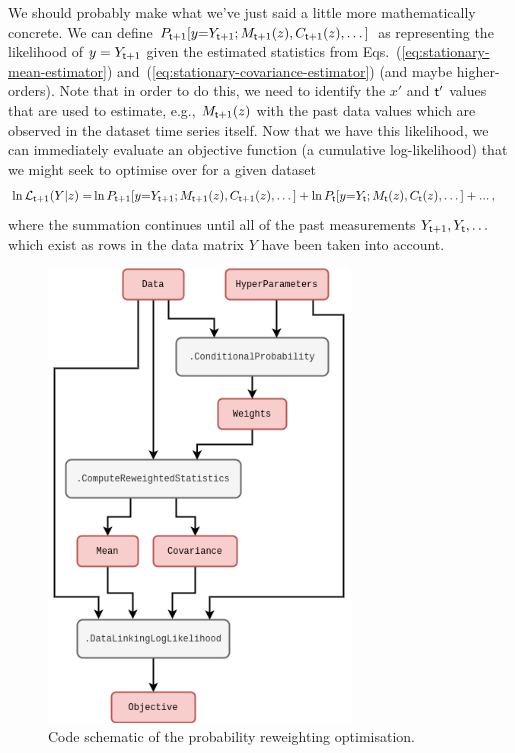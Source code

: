 We should probably make what we've just said a little more mathematically concrete. We can define $P_{{\sf t}+1}[y{=}Y_{{\sf t}+1};M_{{\sf t}+1}(z),C_{{\sf t}+1}(z),\dots ]$ as representing the likelihood of $y=Y_{{\sf t}+1}$ given the estimated statistics from Eqs.~(\ref{eq:stationary-mean-estimator}) and~(\ref{eq:stationary-covariance-estimator}) (and maybe higher-orders). Note that in order to do this, we need to identify the $x'$ and ${\sf t}'$ values that are used to estimate, e.g., $M_{{\sf t}+1}(z)$ with the past data values which are observed in the dataset time series itself. Now that we have this likelihood, we can immediately evaluate an objective function (a cumulative log-likelihood) that we might seek to optimise over for a given dataset 
\begin{align}
\ln {\cal L}_{{\sf t}+1}(Y\vert z) = &\ln P_{{\sf t}+1}[y{=}Y_{{\sf t}+1};M_{{\sf t}+1}(z),C_{{\sf t}+1}(z),\dots ] + \ln P_{{\sf t}}[y{=}Y_{{\sf t}};M_{{\sf t}}(z),C_{{\sf t}}(z),\dots ] + ... \,, \label{eq:log-likelihood-reweighting}
\end{align}
where the summation continues until all of the past measurements $Y_{{\sf t}+1}, Y_{{\sf t}}, \dots$ which exist as rows in the data matrix $Y$ have been taken into account.

\begin{figure}[h]
\centering
\includegraphics[width=8cm]{images/chapter-4-prob-reweighting-code.drawio.png}
\caption{Code schematic of the probability reweighting optimisation.}
\label{fig:prob-reweighting-code}
\end{figure} 

